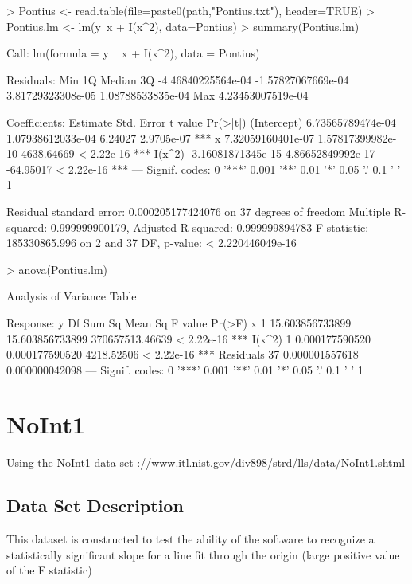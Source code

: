 \documentclass[10pt]{article}
\begin{document}
\begin{Schunk}
\begin{Sinput}
> Pontius <- read.table(file=paste0(path,"Pontius.txt"), header=TRUE)
> Pontius.lm <- lm(y~x + I(x^2), data=Pontius)
> summary(Pontius.lm)
\end{Sinput}
\begin{Soutput}
Call:
lm(formula = y ~ x + I(x^2), data = Pontius)

Residuals:
               Min                 1Q             Median                 3Q 
-4.46840225564e-04 -1.57827067669e-04  3.81729323308e-05  1.08788533835e-04 
               Max 
 4.23453007519e-04 

Coefficients:
                      Estimate         Std. Error    t value   Pr(>|t|)    
(Intercept)  6.73565789474e-04  1.07938612033e-04    6.24027 2.9705e-07 ***
x            7.32059160401e-07  1.57817399982e-10 4638.64669 < 2.22e-16 ***
I(x^2)      -3.16081871345e-15  4.86652849992e-17  -64.95017 < 2.22e-16 ***
---
Signif. codes:  0 '***' 0.001 '**' 0.01 '*' 0.05 '.' 0.1 ' ' 1

Residual standard error: 0.000205177424076 on 37 degrees of freedom
Multiple R-squared:  0.999999900179,	Adjusted R-squared:  0.999999894783 
F-statistic: 185330865.996 on 2 and 37 DF,  p-value: < 2.220446049e-16
\end{Soutput}
\begin{Sinput}
> anova(Pontius.lm)
\end{Sinput}
\begin{Soutput}
Analysis of Variance Table

Response: y
          Df          Sum Sq         Mean Sq         F value     Pr(>F)    
x          1 15.603856733899 15.603856733899 370657513.46639 < 2.22e-16 ***
I(x^2)     1  0.000177590520  0.000177590520      4218.52506 < 2.22e-16 ***
Residuals 37  0.000001557618  0.000000042098                               
---
Signif. codes:  0 '***' 0.001 '**' 0.01 '*' 0.05 '.' 0.1 ' ' 1
\end{Soutput}
\end{Schunk}

\section{NoInt1}
Using the NoInt1 data set \url{://www.itl.nist.gov/div898/strd/lls/data/NoInt1.shtml}

\subsection*{Data Set Description}
This dataset is constructed to test the ability of the software to recognize a 
statistically significant slope for a line fit through the origin (large positive 
value of the F statistic)
\end{document}
